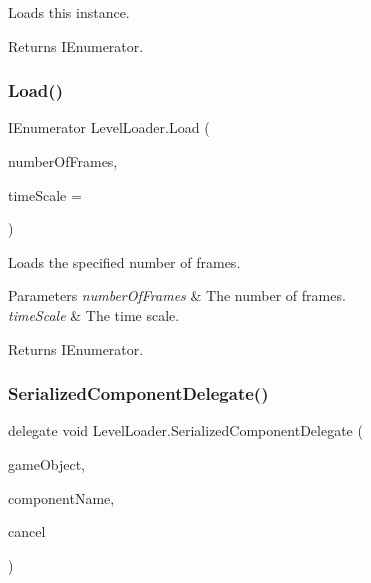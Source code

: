 Loads this instance. 

\begin{DoxyReturn}{Returns}
I\+Enumerator.
\end{DoxyReturn}
\mbox{\label{class_level_loader_a4803ecbc9f8daab6e5a5e09bf7bf8911}} 
\subsubsection{\texorpdfstring{Load()}{Load()}\hspace{0.1cm}{\footnotesize\ttfamily [2/2]}}
{\footnotesize\ttfamily I\+Enumerator Level\+Loader.\+Load (\begin{DoxyParamCaption}\item[{int}]{number\+Of\+Frames,  }\item[{float}]{time\+Scale = {} }\end{DoxyParamCaption})\hspace{0.3cm}{\ttfamily [inline]}}



Loads the specified number of frames. 


\begin{DoxyParams}{Parameters}
{\em number\+Of\+Frames} & The number of frames.\\
\hline
{\em time\+Scale} & The time scale.\\
\hline
\end{DoxyParams}
\begin{DoxyReturn}{Returns}
I\+Enumerator.
\end{DoxyReturn}
\mbox{\label{class_level_loader_a233f68062303e5e0876c93646a9215ba}} 
\subsubsection{\texorpdfstring{Serialized\+Component\+Delegate()}{SerializedComponentDelegate()}}
{\footnotesize\ttfamily delegate void Level\+Loader.\+Serialized\+Component\+Delegate (\begin{DoxyParamCaption}\item[{Game\+Object}]{game\+Object,  }\item[{string}]{component\+Name,  }\item[{ref bool}]{cancel }\end{DoxyParamCaption})}



